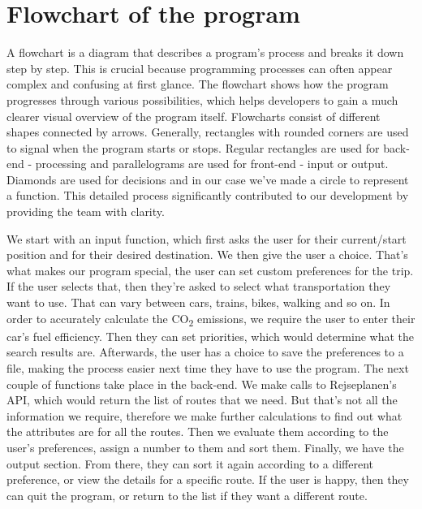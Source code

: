 \section{Flowchart of the program}

A flowchart is a diagram that describes a program's process and breaks it down step by step.
This is crucial because programming processes can often appear complex and confusing at first glance.
The flowchart shows how the program progresses through various possibilities, which helps developers to gain a much
clearer visual overview of the program itself.
Flowcharts consist of different shapes connected by arrows.
Generally, rectangles with rounded corners are used to signal when the program starts or stops.
Regular rectangles are used for back-end - processing and parallelograms are used for front-end - input or output.
Diamonds are used for decisions and in our case we've made a circle to represent a function.
This detailed process significantly contributed to our development by providing the team with clarity.

We start with an input function, which first asks the user for their current/start position and for their desired
destination.
We then give the user a choice.
That's what makes our program special, the user can set custom preferences for the trip.
If the user selects that, then they're asked to select what transportation they want to use.
That can vary between cars, trains, bikes, walking and so on.
In order to accurately calculate the \unit{CO_{2}} emissions, we require the user to enter their car's fuel efficiency.
Then they can set priorities, which would determine what the search results are.
Afterwards, the user has a choice to save the preferences to a file, making the process easier next time they have to
use the program.
The next couple of functions take place in the back-end.
We make calls to Rejseplanen's API, which would return the list of routes that we need.
But that's not all the information we require, therefore we make further calculations to find out what the attributes
are for all the routes.
Then we evaluate them according to the user's preferences, assign a number to them and sort them.
Finally, we have the output section.
From there, they can sort it again according to a different preference, or view the details for a specific route.
If the user is happy, then they can quit the program, or return to the list if they want a different route.



